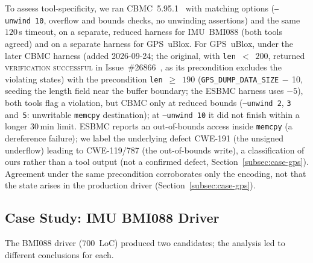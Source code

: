 \documentclass[conference]{IEEEtran}
\newcommand{\entra}[1]{#1}
\newcommand{\corr}[1]{#1}
\begin{document}
To assess tool-specificity, we ran CBMC~5.95.1~\cite{Kroening2014}
with matching options (\texttt{--unwind~10},
overflow and bounds checks, no unwinding assertions) and the same
$120$\,s timeout, on a separate, reduced harness for IMU~BMI088 (both tools agreed) and on a separate harness for GPS~uBlox. For GPS~uBlox,
under \corr{the later CBMC harness (added 2026-09-24; the original, with \texttt{len}~$<$~$200$, returned \textsc{verification successful} in Issue~\#26866~\cite{PX4_Issue26866}, as its precondition excludes the violating states) with the} precondition \texttt{len}~$\geq$~$190$
(\texttt{GPS\_DUMP\_DATA\_SIZE}$\,-\,$10, seeding the length field near
the buffer boundary\corr{; the ESBMC harness uses $-5$}), both tools flag a violation, but CBMC only at reduced bounds (\texttt{--unwind~2}, \texttt{3} and~\texttt{5}: unwritable \texttt{memcpy} destination); at \texttt{--unwind~10} it did not finish within a longer $30$\,min limit.
ESBMC reports an out-of-bounds access inside \texttt{memcpy}
(a dereference failure); we label the underlying defect CWE-191 (the unsigned
underflow) leading to CWE-119/787 (the out-of-bounds write), a classification
of ours rather than a tool output \entra{(not a confirmed defect,
Section~\ref{subsec:case-gps}).}
Agreement under the same precondition corroborates only the encoding, not
that the state arises in the production driver
(Section~\ref{subsec:case-gps}).

\subsection{Case Study: IMU BMI088 Driver}
\label{subsec:case-imu}

The BMI088 driver (700~LoC) produced
two candidates; the analysis led to different conclusions for each.
\end{document}
